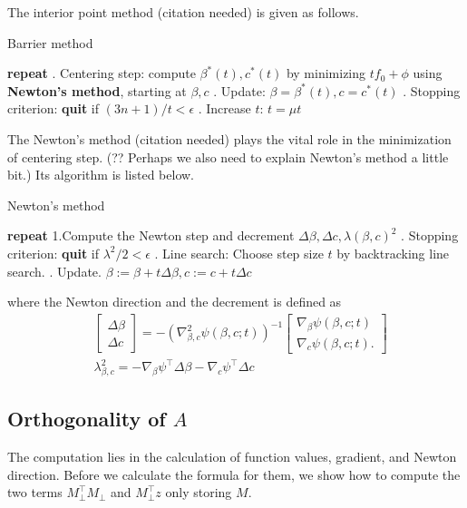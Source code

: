 \documentclass[final,onefignum,onetabnum]{siamart190516}
\begin{document}
The interior point method (citation needed) is given as follows.
\begin{algorithm}[H]
\caption{Barrier method}
\label{alg: barrier method}
\begin{algorithmic}
\STATE \textbf{repeat}
. Centering step: compute $\beta^*(t), c^*(t)$ by minimizing $tf_0+\phi$ using \textbf{Newton's method}, starting at $\beta, c$
. Update: $\beta = \beta^*(t), c = c^*(t)$
. Stopping criterion: \textbf{quit} if $(3n+1)/t<\epsilon$
. Increase $t$: $t = \mu t$
\end{algorithmic}
\end{algorithm}
The Newton's method (citation needed) plays the vital role in the minimization of centering step. (?? Perhaps we also need to explain Newton's method a little bit.) Its algorithm is listed below.
\begin{algorithm}[H]
\caption{Newton's method}
\label{alg: newton's method}
\begin{algorithmic}
\STATE \textbf{repeat}
\STATE 1.Compute the Newton step and decrement $\Delta \beta, \Delta c, \lambda(\beta, c)^2$
. Stopping criterion: \textbf{quit} if $\lambda^2/2<\epsilon$
. Line search: Choose step size $t$ by backtracking line search.
. Update. $\beta := \beta + t\Delta\beta, c:=c+t\Delta c$
\end{algorithmic}
\end{algorithm}
where the Newton direction and the decrement is defined as
\begin{equation}\label{DeltaNTdef}
    \begin{aligned}
    &\begin{bmatrix}
    \Delta \beta\\
    \Delta c
    \end{bmatrix} = -(\nabla^2_{\beta,c} \psi(\beta,c;t))^{-1}
    \begin{bmatrix}
    \nabla_{\beta}\psi(\beta,c;t)\\
    \nabla_c\psi(\beta,c;t).
    \end{bmatrix}\\
    & \lambda_{\beta, c}^2 = -\nabla_{\beta} \psi^{\top}\Delta\beta - \nabla_{c} \psi^{\top}\Delta c
    \end{aligned}
\end{equation}
\subsection{Orthogonality of $A$}
The computation lies in the calculation of function values, gradient, and Newton direction. Before we calculate the formula for them, we show how to compute the two terms $M_{\perp}^{\top}M_{\perp}$ and $M_{\perp}^{\top}z$ only storing $M$.
\end{document}
